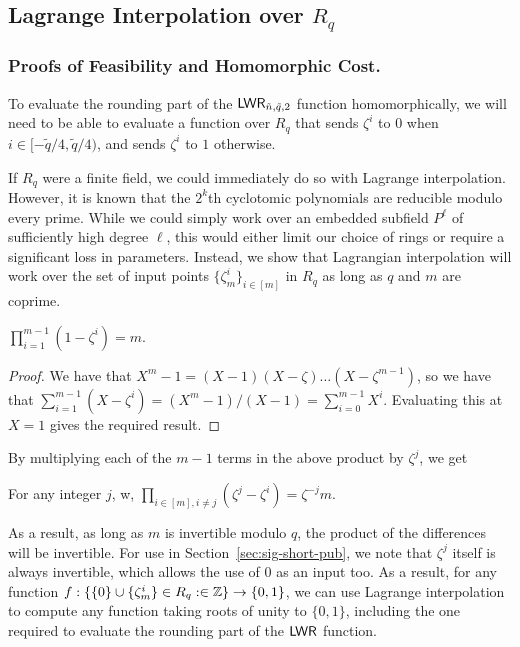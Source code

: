 \subsection{Lagrange Interpolation over
  $R_q$}\label{sec:lagr-interp-over}


\subsubsection{Proofs of Feasibility and Homomorphic Cost.}
\label{sec:proofs-feasibility}

To evaluate the rounding part of the $\mathsf{LWR}_{\tilde{n},\tilde{q},2}$ function homomorphically,
we will need to be able to evaluate a function over $R_q$ that sends $\zeta^i$ to
$0$ when $i \in [-\tilde{q}/4,\tilde{q}/4)$, and sends $\zeta^i$ to $1$ otherwise.    

If $R_q$ were a finite field, we could immediately do so with Lagrange
interpolation. However, it is known that the $2^k$th cyclotomic polynomials are
reducible modulo every prime. 
While we could simply work over an embedded subfield $P^{\ell}$ of
sufficiently high degree $\ell$, this would either limit our choice of
rings or require a significant loss in parameters. Instead, we show
that Lagrangian interpolation will work over the set of input points
$\{\zeta_{m}^{i}\}_{i \in [m]}$ in $R_{q}$ as long as $q$
and $m$ are coprime. 

\begin{lemma}\label{lem:prod_stuff} $\prod_{i=1}^{m-1}(1-\zeta^i) = m$.
\end{lemma}
\begin{proof}
We have that $X^{m}-1=(X-1)(X-\zeta)\ldots (X-\zeta^{m-1})$, so we
have that $\sum_{i=1}^{m-1}(X-\zeta^{i}) = (X^{m}-1)/(X-1)=\sum_{i=0}^{m-1}X^{i}$. Evaluating this at $X=1$
gives the required result.
\end{proof}

By multiplying each of the $m-1$ terms in the above product by
$\zeta^{j}$, we get 
\begin{corollary}\label{cor:invertibledenom}
For any integer $j$,
w, $\prod_{i \in [m], i \neq j}(\zeta^j-\zeta^i) = \zeta^{-j}m$.
\end{corollary}

As a result, as long as $m$ is invertible modulo $q$, the product of
the differences will be invertible. For use in
Section~\ref{sec:sig-short-pub}, we note that $\zeta^{j}$ itself is
always invertible, which allows the use of $0$ as an input too. 
As a result,  for any function $f: \{\{0\} \cup \{\zeta_m^{i}\} \in R_q: \in \mathbb{Z}\} \to
\{0,1\}$, we can use Lagrange interpolation to compute any function taking
roots of unity to $\{0,1\}$, including the one required to evaluate the
rounding part of the $\mathsf{LWR}$ function.

